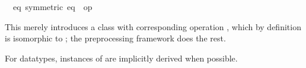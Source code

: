 \begin{isabellebody}
\isanewline
{}\isamarkupfalse%
\isanewline
\ \ eq\ {\isacharbrackleft}symmetric{\isacharbrackright}{\isacharcolon}\ {\isachardoublequoteopen}eq\ {\isasymequiv}\ {\isacharparenleft}op\ {\isacharequal}{\isacharparenright}{\isachardoublequoteclose}%
\begin{isamarkuptext}%
This merely introduces a class  with corresponding
  operation , which by definition is isomorphic
  to ; the preprocessing framework does the rest.%
\end{isamarkuptext}%
\isamarkuptrue%
%
\isadelimML
%
\endisadelimML
%
\isatagML
%
\endisatagML
{\isafoldML}%
%
\isadelimML
%
\endisadelimML
%
\begin{isamarkuptext}%
For datatypes, instances of  are implicitly derived
  when possible.


\end{isamarkuptext}
\end{isabellebody}
